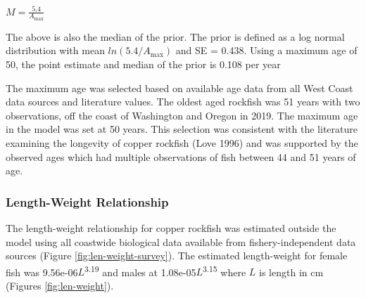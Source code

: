 \documentclass[11pt,
  english,
  a4paper,
]{article}
\begin{document}
\leavevmode\tagmcend\tagstructend\par

\begin{centering}

$M=\frac{5.4}{A_{\text{max}}}$

\end{centering}

\vspace{0.5cm}


The above is also the median of the prior. The prior is defined as a log normal distribution with mean {\(ln(5.4/A_{\text{max}})\)\leavevmode\tagmcend\tagstructend} and SE = 0.438. Using a maximum age of 50, the point estimate and median of the prior is 0.108 per year

\leavevmode\tagmcend\tagstructend\par


The maximum age was selected based on available age data from all West Coast data sources and literature values. The oldest aged rockfish was 51 years with two observations, off the coast of Washington and Oregon in 2019. The maximum age in the model was set at 50 years. This selection was consistent with the literature examining the longevity of copper rockfish {(Love 1996)\leavevmode\tagmcend\tagstructend} and was supported by the observed ages which had multiple observations of fish between 44 and 51 years of age.

\leavevmode\tagmcend\tagstructend\par


\hypertarget{length-weight-relationship}{%
\subsubsection{Length-Weight Relationship}\label{length-weight-relationship}}

\leavevmode\tagmcend\tagstructend


The length-weight relationship for copper rockfish was estimated outside the model using all coastwide biological data available from fishery-independent data sources (Figure \ref{fig:len-weight-survey}). The estimated length-weight for female fish was 9.56e-06{\(L\)\leavevmode\tagmcend\tagstructend}\textsuperscript{3.19} and males at 1.08e-05{\(L\)\leavevmode\tagmcend\tagstructend}\textsuperscript{3.15} where {\(L\)\leavevmode\tagmcend\tagstructend} is length in cm (Figures \ref{fig:len-weight}).
\end{document}
